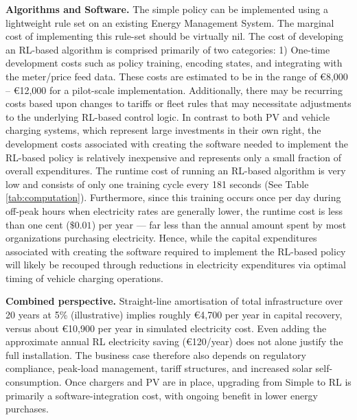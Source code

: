 \textbf{Algorithms and Software.} The simple policy can be implemented using a lightweight rule set on an existing Energy Management System. The marginal cost of implementing this rule-set should be virtually nil. The cost of developing an RL-based algorithm is comprised primarily of two categories: 1) One-time development costs such as policy training, encoding states, and integrating with the meter/price feed data. These costs are estimated to be in the range of €8,000 -- €12,000 for a pilot-scale implementation. Additionally, there may be recurring costs based upon changes to tariffs or fleet rules that may necessitate adjustments to the underlying RL-based control logic. In contrast to both PV and vehicle charging systems, which represent large investments in their own right, the development costs associated with creating the software needed to implement the RL-based policy is relatively inexpensive and represents only a small fraction of overall expenditures. The runtime cost of running an RL-based algorithm is very low and consists of only one training cycle every 181 seconds (See Table \ref{tab:computation}). Furthermore, since this training occurs once per day during off-peak hours when electricity rates are generally lower, the runtime cost is less than one cent ($\$ 0.01$) per year --- far less than the annual amount spent by most organizations purchasing electricity. Hence, while the capital expenditures associated with creating the software required to implement the RL-based policy will likely be recouped through reductions in electricity expenditures via optimal timing of vehicle charging operations.

\textbf{Combined perspective.} Straight-line amortisation of total infrastructure over 20 years at 5\% (illustrative) implies roughly €4{,}700 per year in capital recovery, versus about €10{,}900 per year in simulated electricity cost. Even adding the approximate annual RL electricity saving (€120/year) does not alone justify the full installation. The business case therefore also depends on regulatory compliance, peak-load management, tariff structures, and increased solar self-consumption. Once chargers and PV are in place, upgrading from Simple to RL is primarily a software-integration cost, with ongoing benefit in lower energy purchases.